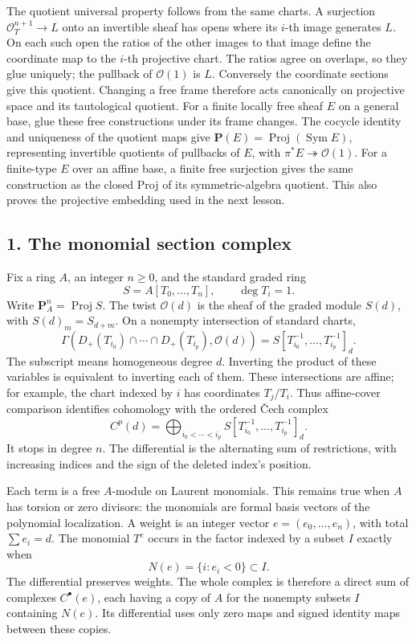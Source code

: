 \documentclass[11pt]{article}
\begin{document}
The quotient universal property follows from the same charts. A
surjection \(\mathcal O_T^{n+1}\to L\) onto an invertible sheaf has
opens where its \(i\)-th image generates \(L\). On each such open the
ratios of the other images to that image define the coordinate map to
the \(i\)-th projective chart. The ratios agree on overlaps, so they
glue uniquely; the pullback of \(\mathcal O(1)\) is \(L\). Conversely
the coordinate sections give this quotient. Changing a free frame
therefore acts canonically on projective space and its tautological
quotient. For a finite locally free sheaf \(E\) on a general base, glue
these free constructions under its frame changes. The cocycle identity
and uniqueness of the quotient maps give
\(\mathbf P(E)=\operatorname{Proj}(\operatorname{Sym}E)\), representing
invertible quotients of pullbacks of \(E\), with
\(\pi^*E\twoheadrightarrow\mathcal O(1)\). For a finite-type \(E\) over
an affine base, a finite free surjection gives the same construction as
the closed Proj of its symmetric-algebra quotient. This also proves the
projective embedding used in the next lesson.

\subsection{1. The monomial section
complex}\label{the-monomial-section-complex}

Fix a ring \(A\), an integer \(n\ge0\), and the standard graded ring \[
S=A[T_0,\ldots,T_n],\qquad\deg T_i=1.
\] Write \(\mathbf P_A^n=\operatorname{Proj}S\). The twist
\(\mathcal O(d)\) is the sheaf of the graded module \(S(d)\), with
\(S(d)_m=S_{d+m}\). On a nonempty intersection of standard charts, \[
\Gamma(D_+(T_{i_0})\cap\cdots\cap D_+(T_{i_p}),\mathcal O(d))
=S[T_{i_0}^{-1},\ldots,T_{i_p}^{-1}]_d.
\] The subscript means homogeneous degree \(d\). Inverting the product
of these variables is equivalent to inverting each of them. These
intersections are affine; for example, the chart indexed by \(i\) has
coordinates \(T_j/T_i\). Thus affine-cover comparison identifies
cohomology with the ordered Čech complex \[
C^p(d)=\bigoplus_{i_0<\cdots<i_p}
S[T_{i_0}^{-1},\ldots,T_{i_p}^{-1}]_d.
\] It stops in degree \(n\). The differential is the alternating sum of
restrictions, with increasing indices and the sign of the deleted
index's position.

Each term is a free \(A\)-module on Laurent monomials. This remains true
when \(A\) has torsion or zero divisors: the monomials are formal basis
vectors of the polynomial localization. A weight is an integer vector
\(e=(e_0,\ldots,e_n)\), with total \(\sum e_i=d\). The monomial \(T^e\)
occurs in the factor indexed by a subset \(I\) exactly when \[
N(e)=\{i:e_i<0\}\subset I.
\] The differential preserves weights. The whole complex is therefore a
direct sum of complexes \(C^\bullet(e)\), each having a copy of \(A\)
for the nonempty subsets \(I\) containing \(N(e)\). Its differential
uses only zero maps and signed identity maps between these copies.
\end{document}
